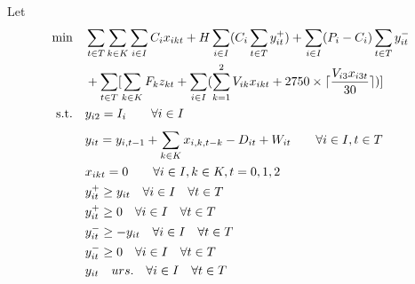 \documentclass[12pt,a4paper]{article}
\begin{document}
Let\\

\begin{equation*}\\
\begin{aligned}
\mbox{min} \quad &\sum_{t \in T}\sum_{k \in K}\sum_{i \in I}C_ix_{ikt} + H\sum_{i \in I}(C_i\sum_{t \in T}y_{it}^+) + \sum_{i \in I}(P_i-C_i)\sum_{t \in T}y_{it}^-\\ &+ \sum_{t\in T}^{}[\sum_{k\in K}^{}F_kz_{kt}+ \sum_{i \in I}^{}(\sum_{k=1}^{2} V_{ik}x_{ikt}+2750\times\lceil \frac{V_{i3}x_{i3t}}{30} \rceil)]\\
\mbox{s.t.} \quad &y_{i2} = I_{i}\qquad\forall i \in I\\
&y_{it} = y_{i,t-1}+ \sum_{k \in K}^{} x_{i,k,t-k} - D_{it} + W_{it}\qquad \forall i \in I, t \in T\\
&x_{ikt} = 0\qquad\forall i \in I, k \in K, t=0,1,2\\
&y_{it}^+ \geq y_{it} \quad \forall i \in I \quad \forall t \in T\\
&y_{it}^+ \geq 0  \quad \forall i \in I \quad \forall t \in T\\
&y_{it}^- \geq -y_{it}  \quad \forall i \in I \quad \forall t \in T\\
&y_{it}^- \geq 0  \quad \forall i \in I \quad \forall t \in T\\
&y_{it} \quad urs. \quad \forall i \in I \quad \forall t \in T\\
\end{aligned}
\end{equation*}
\end{document}
